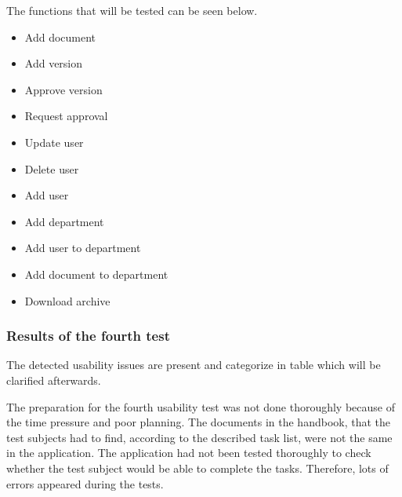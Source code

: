 \documentclass[../../master.tex]{subfiles}
\begin{document}
The functions that will be tested can be seen below.

\begin{itemize}
	\item Add document
	\item Add version
	\item Approve version
	\item Request approval
	\item Update user
	\item Delete user
	\item Add user
	\item Add department
	\item Add user to department
	\item Add document to department
	\item Download archive
\end{itemize}

\subsubsection*{Results of the fourth test}
The detected usability issues are present and categorize in table
 which will be clarified afterwards.

The preparation for the fourth usability test was not done thoroughly because of the time pressure and poor planning.
The documents in the handbook, that the test subjects had to find, according to the described task list, were not the same in the application.
The application had not been tested thoroughly to check whether the test subject would be able to complete the tasks.
Therefore, lots of errors appeared during the tests.
\end{document}
